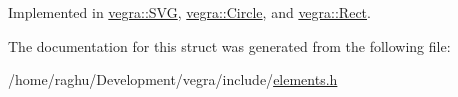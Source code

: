 Implemented in \mbox{\hyperlink{structvegra_1_1SVG_ae7192d00544cf372f5dfed2b2436c973}{vegra\+::\+S\+VG}}, \mbox{\hyperlink{structvegra_1_1Circle_a67bfa48e7697a6ee3e7c79fed1129a3c}{vegra\+::\+Circle}}, and \mbox{\hyperlink{structvegra_1_1Rect_a1a0b6b2fa5804f2554f62d41c3a156f3}{vegra\+::\+Rect}}.



The documentation for this struct was generated from the following file\+:\begin{DoxyCompactItemize}
\item 
/home/raghu/\+Development/vegra/include/\mbox{\hyperlink{elements_8h}{elements.\+h}}\end{DoxyCompactItemize}
